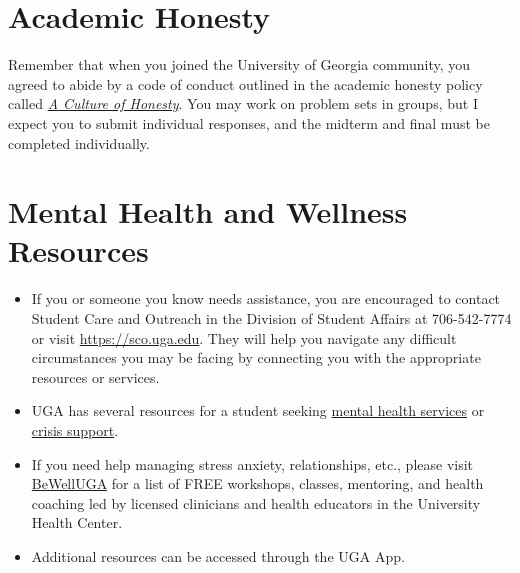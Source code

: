\documentclass[11pt, letterpaper]{article}
\begin{document}



\section*{Academic Honesty}
Remember that when you joined the University of Georgia community, you agreed to abide by a code of conduct outlined in the academic honesty policy called \href{https://honesty.uga.edu/Academic-Honesty-Policy/Introduction/}{\textit{A Culture of Honesty}}. You may work on problem sets in groups, but I expect you to submit individual responses, and the midterm and final must be completed individually.

\section*{Mental Health and Wellness Resources}

\begin{itemize}
\item If you or someone you know needs assistance, you are encouraged to contact Student Care and Outreach in the Division of Student Affairs at 706-542-7774 or visit \href{https://sco.uga.edu}{https://sco.uga.edu}. They will help you navigate any difficult circumstances you may be facing by connecting you with the appropriate resources or services.
\item UGA has several resources for a student seeking \href{https://www.uhs.uga.edu/bewelluga/bewelluga}{mental health services} or \href{https://www.uhs.uga.edu/info/emergencies}{crisis support}.
\item If you need help managing stress anxiety, relationships, etc., please visit \href{https://www.uhs.uga.edu/bewelluga/bewelluga}{BeWellUGA} for a list of FREE workshops, classes, mentoring, and health coaching led by licensed clinicians and health educators in the University Health Center.
\item Additional resources can be accessed through the UGA App.
\end{itemize}



\end{document}
